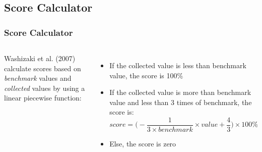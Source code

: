 \subsection{Score Calculator}
\begin{frame}
\frametitle{Score Calculator}

\begin{columns}
Washizaki et al. (2007) calculate scores based on \emph{benchmark} values and \emph{collected} values by using a linear piecewise function:
\begin{itemize}
  \item<1,4> If the collected value is less than benchmark value, the score is 100\%
  \item<2,4> If the collected value is more than benchmark value and less than 3 times of benchmark, the score is: $$score=\bigg(-\frac{1}{3 \times benchmark} \times value + \frac{4}{3}\bigg) \times 100\%$$
  \item<3,4> Else, the score is zero
\end{itemize}


\end{columns}

\end{frame}
